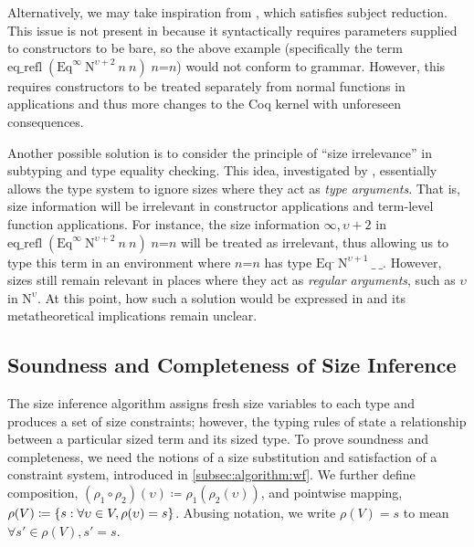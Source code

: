 Alternatively, we may take inspiration from \CIChatminus, which satisfies
subject reduction. This issue is not present in \CIChatminus because it
syntactically requires parameters supplied to
constructors to be bare, so the above example (specifically the term
$\textrm{eq\_refl} \; (\textrm{Eq}^\infty ~ \textrm{N}^{\upsilon+2} ~
n ~ n) \; n\textrm{=}n$) would not conform to \CIChatminus grammar.
%
However, this requires constructors to be treated separately from
normal functions in applications and thus more changes to the
Coq kernel with unforeseen consequences.


%
Another possible solution is to consider the principle of ``size
irrelevance'' in subtyping and type equality checking.
%
This idea, investigated by \citet{sizeirrelevance}, essentially allows
the type system to ignore sizes where they act as \emph{type arguments}.
%
That is, size information will be irrelevant in
constructor applications and term-level function applications.
%
For instance, the size information $\infty, \upsilon+2$ in
$\textrm{eq\_refl} \; (\textrm{Eq}^\infty ~ \textrm{N}^{\upsilon+2} ~
n ~ n) \; n\textrm{=}n$ will be treated as irrelevant, thus allowing
us to type this term in an environment where $n\textrm{=}n$ has
type $\textrm{Eq}^\_ ~ \textrm{N}^{\upsilon+1} ~ \_ ~ \_$.
%
However, sizes still remain relevant in places
where they act as \emph{regular arguments}, such as $\upsilon$ in
$\textrm{N}^\upsilon$.
%
At this point, how such a solution would be expressed in \lang and
its metatheoretical implications remain unclear.

\subsection{Soundness and Completeness of Size Inference}\label{sec:meta:sound-complete}
The size inference algorithm assigns fresh size variables to each \coinductive type and produces a set of size constraints; however, the typing rules of \lang state a relationship between a particular sized term and its sized type.
To prove soundness and completeness, we need the notions of a size substitution and satisfaction of a constraint system, introduced in \autoref{subsec:algorithm:wf}.
We further define composition, $(\rho_1 \circ \rho_2)(\upsilon) \coloneqq \rho_1(\rho_2(\upsilon))$, and pointwise mapping, $\rho(V) \coloneqq \{s : \forall \upsilon \in V, \rho(\upsilon) = s\}$.
Abusing notation, we write $\rho(V) = s$ to mean $\forall s' \in \rho(V), s' = s$.

